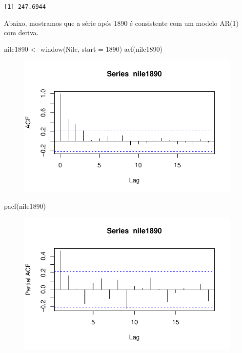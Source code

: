 \documentclass[
  letterpaper,
  DIV=11,
  numbers=noendperiod]{scrartcl}
\newenvironment{Shaded}{\begin{snugshade}}{\end{snugshade}}
\newcommand{\AttributeTok}[1]{\textcolor[rgb]{0.40,0.45,0.13}{#1}}
\newcommand{\DecValTok}[1]{\textcolor[rgb]{0.68,0.00,0.00}{#1}}
\newcommand{\FunctionTok}[1]{\textcolor[rgb]{0.28,0.35,0.67}{#1}}
\newcommand{\NormalTok}[1]{\textcolor[rgb]{0.00,0.23,0.31}{#1}}
\newcommand{\OtherTok}[1]{\textcolor[rgb]{0.00,0.23,0.31}{#1}}
\theoremstyle{plain}
\theoremstyle{plain}
\theoremstyle{definition}
\theoremstyle{definition}
\theoremstyle{remark}
\begin{document}
\begin{verbatim}
[1] 247.6944
\end{verbatim}

Abaixo, mostramos que a série após 1890 é consistente com um modelo
AR(1) com deriva.

\begin{Shaded}
\begin{Highlighting}[]
\NormalTok{nile1890 }\OtherTok{\textless{}{-}} \FunctionTok{window}\NormalTok{(Nile, }\AttributeTok{start =} \DecValTok{1890}\NormalTok{)}
\FunctionTok{acf}\NormalTok{(nile1890)}
\end{Highlighting}
\end{Shaded}

\begin{figure}[H]

{\centering \includegraphics{intervencao_files/figure-pdf/unnamed-chunk-6-1.pdf}

}

\end{figure}

\begin{Shaded}
\begin{Highlighting}[]
\FunctionTok{pacf}\NormalTok{(nile1890)}
\end{Highlighting}
\end{Shaded}

\begin{figure}[H]

{\centering \includegraphics{intervencao_files/figure-pdf/unnamed-chunk-6-2.pdf}

}

\end{figure}
\end{document}
